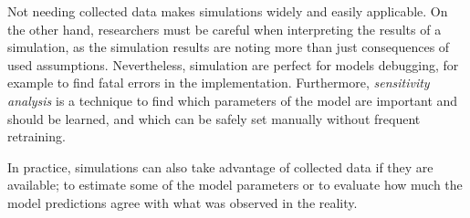 Not needing collected data makes simulations widely and easily applicable.
On the other hand, researchers must be careful when interpreting
  the results of a simulation, as the simulation results are noting more than
  just consequences of used assumptions.
Nevertheless, simulation are perfect for models debugging,
  for example to find fatal errors in the implementation.
Furthermore, \emph{sensitivity analysis} is a technique to find
  which parameters of the model are important and should be learned,
  and which can be safely set manually without frequent retraining.

In practice, simulations can also take advantage of collected data
  if they are available; to estimate some of the model parameters
  or to evaluate how much the model predictions agree with
  what was observed in the reality.












